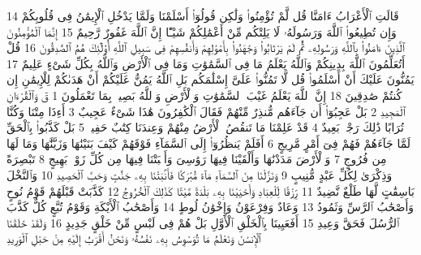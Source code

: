 {\tiny\colorbox{cl_aya}{14}} قَالَتِ ٱلْأَعْرَابُ ءَامَنَّا قُل لَّمْ تُؤْمِنُوا۟ وَلَٰكِن قُولُوٓا۟ أَسْلَمْنَا وَلَمَّا يَدْخُلِ ٱلْإِيمَٰنُ فِى قُلُوبِكُمْ وَإِن تُطِيعُوا۟ ٱللَّهَ وَرَسُولَهُۥ لَا يَلِتْكُم مِّنْ أَعْمَٰلِكُمْ شَيْـًٔا إِنَّ ٱللَّهَ غَفُورٌ رَّحِيمٌ
{\tiny\colorbox{cl_aya}{15}} إِنَّمَا ٱلْمُؤْمِنُونَ ٱلَّذِينَ ءَامَنُوا۟ بِٱللَّهِ وَرَسُولِهِۦ ثُمَّ لَمْ يَرْتَابُوا۟ وَجَٰهَدُوا۟ بِأَمْوَٰلِهِمْ وَأَنفُسِهِمْ فِى سَبِيلِ ٱللَّهِ أُو۟لَٰٓئِكَ هُمُ ٱلصَّٰدِقُونَ
{\tiny\colorbox{cl_aya}{16}} قُلْ أَتُعَلِّمُونَ ٱللَّهَ بِدِينِكُمْ وَٱللَّهُ يَعْلَمُ مَا فِى ٱلسَّمَٰوَٰتِ وَمَا فِى ٱلْأَرْضِ وَٱللَّهُ بِكُلِّ شَىْءٍ عَلِيمٌ
{\tiny\colorbox{cl_aya}{17}} يَمُنُّونَ عَلَيْكَ أَنْ أَسْلَمُوا۟ قُل لَّا تَمُنُّوا۟ عَلَىَّ إِسْلَٰمَكُم بَلِ ٱللَّهُ يَمُنُّ عَلَيْكُمْ أَنْ هَدَىٰكُمْ لِلْإِيمَٰنِ إِن كُنتُمْ صَٰدِقِينَ
{\tiny\colorbox{cl_aya}{18}} إِنَّ ٱللَّهَ يَعْلَمُ غَيْبَ ٱلسَّمَٰوَٰتِ وَٱلْأَرْضِ وَٱللَّهُ بَصِيرٌۢ بِمَا تَعْمَلُونَ
{\tiny\colorbox{cl_aya}{1}} قٓ وَٱلْقُرْءَانِ ٱلْمَجِيدِ
{\tiny\colorbox{cl_aya}{2}} بَلْ عَجِبُوٓا۟ أَن جَآءَهُم مُّنذِرٌ مِّنْهُمْ فَقَالَ ٱلْكَٰفِرُونَ هَٰذَا شَىْءٌ عَجِيبٌ
{\tiny\colorbox{cl_aya}{3}} أَءِذَا مِتْنَا وَكُنَّا تُرَابًا ذَٰلِكَ رَجْعٌۢ بَعِيدٌ
{\tiny\colorbox{cl_aya}{4}} قَدْ عَلِمْنَا مَا تَنقُصُ ٱلْأَرْضُ مِنْهُمْ وَعِندَنَا كِتَٰبٌ حَفِيظٌۢ
{\tiny\colorbox{cl_aya}{5}} بَلْ كَذَّبُوا۟ بِٱلْحَقِّ لَمَّا جَآءَهُمْ فَهُمْ فِىٓ أَمْرٍ مَّرِيجٍ
{\tiny\colorbox{cl_aya}{6}} أَفَلَمْ يَنظُرُوٓا۟ إِلَى ٱلسَّمَآءِ فَوْقَهُمْ كَيْفَ بَنَيْنَٰهَا وَزَيَّنَّٰهَا وَمَا لَهَا مِن فُرُوجٍ
{\tiny\colorbox{cl_aya}{7}} وَٱلْأَرْضَ مَدَدْنَٰهَا وَأَلْقَيْنَا فِيهَا رَوَٰسِىَ وَأَنۢبَتْنَا فِيهَا مِن كُلِّ زَوْجٍۭ بَهِيجٍ
{\tiny\colorbox{cl_aya}{8}} تَبْصِرَةً وَذِكْرَىٰ لِكُلِّ عَبْدٍ مُّنِيبٍ
{\tiny\colorbox{cl_aya}{9}} وَنَزَّلْنَا مِنَ ٱلسَّمَآءِ مَآءً مُّبَٰرَكًا فَأَنۢبَتْنَا بِهِۦ جَنَّٰتٍ وَحَبَّ ٱلْحَصِيدِ
{\tiny\colorbox{cl_aya}{10}} وَٱلنَّخْلَ بَاسِقَٰتٍ لَّهَا طَلْعٌ نَّضِيدٌ
{\tiny\colorbox{cl_aya}{11}} رِّزْقًا لِّلْعِبَادِ وَأَحْيَيْنَا بِهِۦ بَلْدَةً مَّيْتًا كَذَٰلِكَ ٱلْخُرُوجُ
{\tiny\colorbox{cl_aya}{12}} كَذَّبَتْ قَبْلَهُمْ قَوْمُ نُوحٍ وَأَصْحَٰبُ ٱلرَّسِّ وَثَمُودُ
{\tiny\colorbox{cl_aya}{13}} وَعَادٌ وَفِرْعَوْنُ وَإِخْوَٰنُ لُوطٍ
{\tiny\colorbox{cl_aya}{14}} وَأَصْحَٰبُ ٱلْأَيْكَةِ وَقَوْمُ تُبَّعٍ كُلٌّ كَذَّبَ ٱلرُّسُلَ فَحَقَّ وَعِيدِ
{\tiny\colorbox{cl_aya}{15}} أَفَعَيِينَا بِٱلْخَلْقِ ٱلْأَوَّلِ بَلْ هُمْ فِى لَبْسٍ مِّنْ خَلْقٍ جَدِيدٍ
{\tiny\colorbox{cl_aya}{16}} وَلَقَدْ خَلَقْنَا ٱلْإِنسَٰنَ وَنَعْلَمُ مَا تُوَسْوِسُ بِهِۦ نَفْسُهُۥ وَنَحْنُ أَقْرَبُ إِلَيْهِ مِنْ حَبْلِ ٱلْوَرِيدِ
